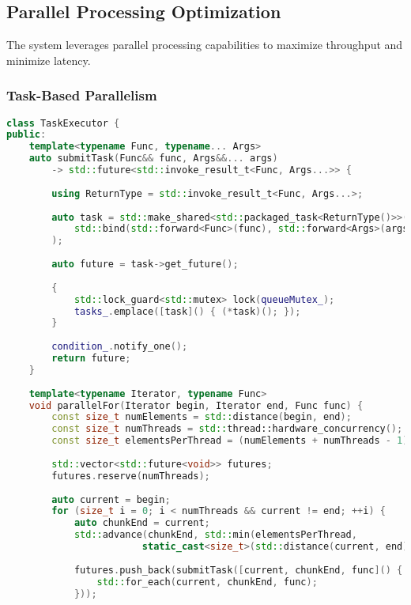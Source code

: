 \subsection{Parallel Processing Optimization}
\label{subsec:parallel_processing}

The system leverages parallel processing capabilities to maximize throughput and minimize latency.

\subsubsection{Task-Based Parallelism}

\begin{lstlisting}[language=C++, caption=Advanced Task Queue System]
class TaskExecutor {
public:
    template<typename Func, typename... Args>
    auto submitTask(Func&& func, Args&&... args) 
        -> std::future<std::invoke_result_t<Func, Args...>> {
        
        using ReturnType = std::invoke_result_t<Func, Args...>;
        
        auto task = std::make_shared<std::packaged_task<ReturnType()>>(
            std::bind(std::forward<Func>(func), std::forward<Args>(args)...)
        );
        
        auto future = task->get_future();
        
        {
            std::lock_guard<std::mutex> lock(queueMutex_);
            tasks_.emplace([task]() { (*task)(); });
        }
        
        condition_.notify_one();
        return future;
    }
    
    template<typename Iterator, typename Func>
    void parallelFor(Iterator begin, Iterator end, Func func) {
        const size_t numElements = std::distance(begin, end);
        const size_t numThreads = std::thread::hardware_concurrency();
        const size_t elementsPerThread = (numElements + numThreads - 1) / numThreads;
        
        std::vector<std::future<void>> futures;
        futures.reserve(numThreads);
        
        auto current = begin;
        for (size_t i = 0; i < numThreads && current != end; ++i) {
            auto chunkEnd = current;
            std::advance(chunkEnd, std::min(elementsPerThread, 
                        static_cast<size_t>(std::distance(current, end))));
            
            futures.push_back(submitTask([current, chunkEnd, func]() {
                std::for_each(current, chunkEnd, func);
            }));
            

\end{lstlisting}
